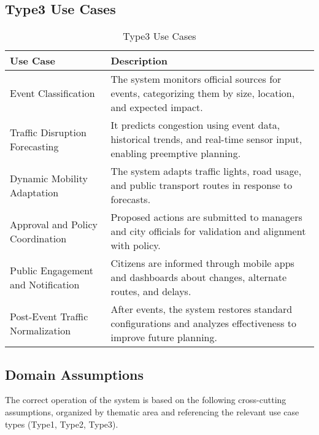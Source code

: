 \documentclass[a4paper,12pt]{article}
\begin{document}
\subsection*{Type3 Use Cases}
\begin{table}[h!]
\centering
\begin{tabular}{|p{4.5cm}|p{8.5cm}|}
\hline
\textbf{Use Case} & \textbf{Description} \\
\hline
Event Classification & The system monitors official sources for events, categorizing them by size, location, and expected impact. \\
\hline
Traffic Disruption Forecasting & It predicts congestion using event data, historical trends, and real-time sensor input, enabling preemptive planning. \\
\hline
Dynamic Mobility Adaptation & The system adapts traffic lights, road usage, and public transport routes in response to forecasts. \\
\hline
Approval and Policy Coordination & Proposed actions are submitted to managers and city officials for validation and alignment with policy. \\
\hline
Public Engagement and Notification & Citizens are informed through mobile apps and dashboards about changes, alternate routes, and delays. \\
\hline
Post-Event Traffic Normalization & After events, the system restores standard configurations and analyzes effectiveness to improve future planning. \\
\hline
\end{tabular}
\caption{Type3 Use Cases}
\end{table}

\newpage

\subsection{Domain Assumptions}

The correct operation of the system is based on the following cross-cutting assumptions, organized by thematic area and referencing the relevant use case types (Type1, Type2, Type3).
\end{document}
